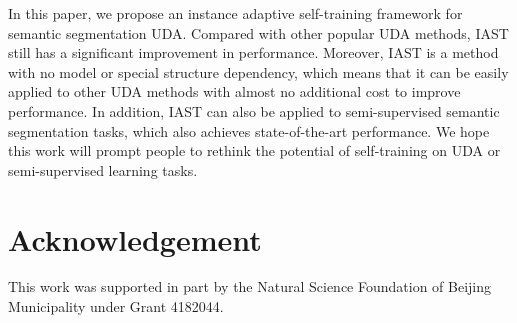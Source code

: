 \documentclass[runningheads]{llncs}
\begin{document}
In this paper, we propose an instance adaptive self-training framework for semantic segmentation UDA. Compared with other popular UDA methods, IAST still has a significant improvement in performance. Moreover, IAST is a method with no model or special structure dependency, which means that it can be easily applied to other UDA methods with almost no additional cost to improve performance. In addition, IAST can also be applied to semi-supervised semantic segmentation tasks, which also achieves state-of-the-art performance. We hope this work will prompt people to rethink the potential of self-training on UDA or semi-supervised learning tasks.

\section*{Acknowledgement}
This work was supported in part by the Natural Science Foundation of Beijing Municipality under Grant 4182044.
\end{document}
